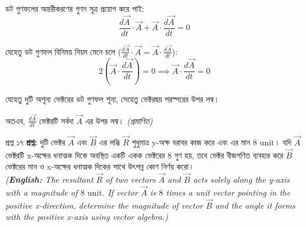 \documentclass[11pt,a4paper]{article}
\begin{document}
\begin{solbox}
\begin{solbox}
ডট গুণফলের অন্তরীকরণের গুণন সূত্র প্রয়োগ করে পাই:
$$\frac{d\vec{A}}{dt} \cdot \vec{A} + \vec{A} \cdot \frac{d\vec{A}}{dt} = 0$$

যেহেতু ডট গুণফল বিনিময় নিয়ম মেনে চলে ($\frac{d\vec{A}}{dt} \cdot \vec{A} = \vec{A} \cdot \frac{d\vec{A}}{dt}$):
$$2\left(\vec{A} \cdot \frac{d\vec{A}}{dt}\right) = 0 \implies \vec{A} \cdot \frac{d\vec{A}}{dt} = 0$$

যেহেতু দুটি অশূন্য ভেক্টরের ডট গুণফল শূন্য, সেহেতু ভেক্টরদ্বয় পরস্পরের উপর লম্ব।

অতএব, $\frac{d\vec{A}}{dt}$ ভেক্টরটি সর্বদা $\vec{A}$ এর উপর লম্ব। \hfill \textit{(প্রমাণিত)}
\end{solbox}

\vspace{0.4cm}

\begin{qbox}{প্রশ্ন ১৭}
\textbf{প্রশ্ন:} দুটি ভেক্টর $\vec{A}$ এবং $\vec{B}$ এর লব্ধি $\vec{R}$ শুধুমাত্র y-অক্ষ বরাবর কাজ করে এবং এর মান $8\text{ unit}$। যদি $\vec{A}$ ভেক্টরটি x-অক্ষের ধনাত্মক দিকে অবস্থিত একটি একক ভেক্টরের $8$ গুণ হয়, তবে ভেক্টর বীজগণিত ব্যবহার করে $\vec{B}$ ভেক্টরের মান ও x-অক্ষের ধনাত্মক দিকের সাথে উৎপন্ন কোণ নির্ণয় করো। \\
\textit{(\textbf{English:} The resultant $\vec{R}$ of two vectors $\vec{A}$ and $\vec{B}$ acts solely along the y-axis with a magnitude of $8\text{ unit}$. If vector $\vec{A}$ is $8$ times a unit vector pointing in the positive x-direction, determine the magnitude of vector $\vec{B}$ and the angle it forms with the positive x-axis using vector algebra.)}
\end{qbox}

\begin{solbox}
\begin{center}
\end{center}
\end{solbox}
\end{solbox}
\end{document}
